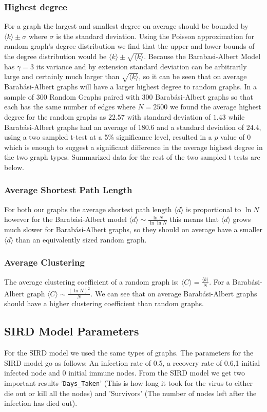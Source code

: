 \documentclass{article}
\begin{document}
                \subsubsection{Highest degree}
                For a graph the largest and smallest degree on average should be bounded by $\langle k \rangle \pm \sigma$ where $\sigma$ is the standard deviation. Using the Poisson approximation for random graph's degree distribution we find that the upper and lower bounds of the degree distribution would be $\langle k \rangle \pm \sqrt{\langle k \rangle}$. Because the Barabasi-Albert Model has $\gamma = 3$ its variance and by extension standard deviation can be arbitrarily large and certainly much larger than $\sqrt{\langle k \rangle}$, so it can be seen that on average Barabási-Albert graphs will have a larger highest degree to random graphs. In a sample of 300 Random Graphs paired with 300 Barabási-Albert graphs so that each has the same number of edges where $N =2500$ we found the average highest degree for the random graphs as $22.57$ with standard deviation of $1.43$ while Barabási-Albert graphs had an average of $180.6$ and a standard deviation of $24.4$, using a two sampled t-test at a 5\% significance level, resulted in a $p$ value of 0 which is enough to suggest a significant difference in the average highest degree in the two graph types. Summarized data for the rest of the two sampled t tests are below.
                \subsubsection{Average Shortest Path Length}
                For both our graphs the average shortest path length $\langle d \rangle$ is proportional to $\ln N$ however for the Barabási-Albert model  $\langle d \rangle \sim \frac{\ln N}{\ln \ln N}$ this means that $\langle d \rangle$ grows much slower for Barabási-Albert graphs, so they should on average have a smaller $\langle d \rangle$ than an equivalently sized random graph.
                \subsubsection{Average Clustering}
                The average clustering coefficient of a random graph is: $\langle C \rangle = \frac{\langle k \rangle}{N}$. For a Barabási-Albert graph $\langle C \rangle \sim \frac{(\ln N)^2}{N}$. We can see that on average Barabási-Albert graphs should have a higher clustering coefficient than random graphs.
            \subsection{SIRD Model Parameters}
                For the SIRD model we used the same types of graphs. The parameters for the SIRD model go as follows: An infection rate of 0.5, a recovery rate of 0.6,1 initial infected node and 0 initial immune nodes. From the SIRD model we get two important results '\verb|Days_Taken|' (This is how long it took for the virus to either die out or kill all the nodes) and 'Survivors' (The number of nodes left after the infection has died out). 
\end{document}
